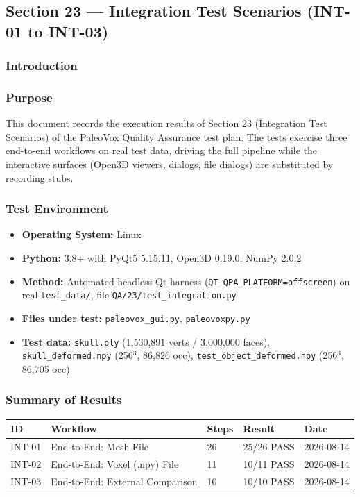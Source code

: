 \documentclass[12pt,a4paper]{article}
\begin{document}
\subsection{Section 23 --- Integration Test Scenarios (INT-01 to INT-03)}

\subsubsection{Introduction}

\subsubsection{Purpose}
This document records the execution results of Section 23 (Integration Test
Scenarios) of the PaleoVox Quality Assurance test plan. The tests exercise
three end-to-end workflows on real test data, driving the full pipeline while
the interactive surfaces (Open3D viewers, dialogs, file dialogs) are
substituted by recording stubs.

\subsubsection{Test Environment}
\begin{itemize}
  \item \textbf{Operating System:} Linux
  \item \textbf{Python:} 3.8+ with PyQt5 5.15.11, Open3D 0.19.0, NumPy 2.0.2
  \item \textbf{Method:} Automated headless Qt harness
    (\texttt{QT\_QPA\_PLATFORM=offscreen}) on real \texttt{test\_data/}, file
    \texttt{QA/23/test\_integration.py}
  \item \textbf{Files under test:} \texttt{paleovox\_gui.py},
    \texttt{paleovoxpy.py}
  \item \textbf{Test data:} \texttt{skull.ply} (1,530,891 verts / 3,000,000
    faces), \texttt{skull\_deformed.npy} (256$^3$, 86,826 occ),
    \texttt{test\_object\_deformed.npy} (256$^3$, 86,705 occ)
\end{itemize}

\subsubsection{Summary of Results}
\begin{longtable}{p{1.4cm}p{7.0cm}p{1.5cm}p{1.5cm}p{2cm}}
\toprule
\textbf{ID} & \textbf{Workflow} & \textbf{Steps} & \textbf{Result} & \textbf{Date} \\
\midrule
INT-01 & End-to-End: Mesh File            & 26 & 25/26 PASS & 2026-08-14 \\
INT-02 & End-to-End: Voxel (.npy) File    & 11 & 10/11 PASS & 2026-08-14 \\
INT-03 & End-to-End: External Comparison  & 10 & 10/10 PASS & 2026-08-14 \\
\bottomrule
\end{longtable}
\end{document}
